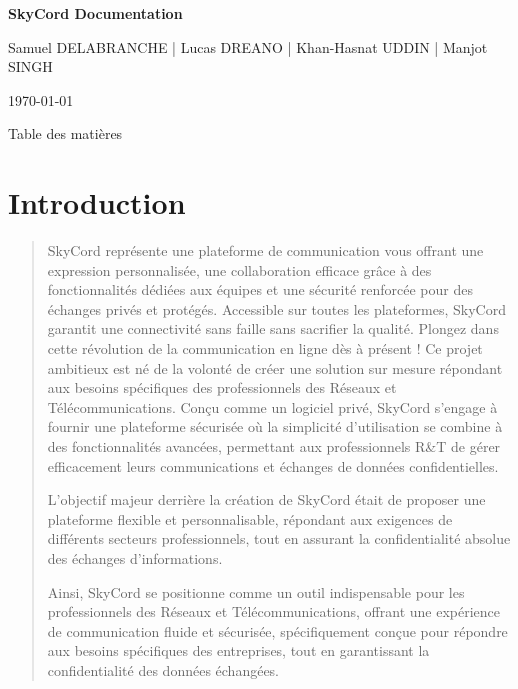 \documentclass{article}
\begin{document}
\noindent\hrulefill
\begin{flushright}
    \textbf{\Large SkyCord Documentation}
    
    Samuel DELABRANCHE | Lucas DREANO | Khan-Hasnat UDDIN | Manjot SINGH

    \vspace*{\fill}
    
    \today
\end{flushright}

\newpage
\vspace*{\fill}

\newpage
\noindent\hrulefill
\begin{flushright}
    \large Table des matières 
\end{flushright}
\noindent\hrulefill

\renewcommand{\contentsname}{}
\tableofcontents
{}

\newpage
{}
\section*{Introduction}

\begin{quote}    
SkyCord représente une plateforme de communication vous offrant une expression personnalisée, une collaboration efficace grâce à des fonctionnalités dédiées aux équipes et une sécurité renforcée pour des échanges privés et protégés. Accessible sur toutes les plateformes, SkyCord garantit une connectivité sans faille sans sacrifier la qualité. Plongez dans cette révolution de la communication en ligne dès à présent !
\vspace*{1\baselineskip}
Ce projet ambitieux est né de la volonté de créer une solution sur mesure répondant aux besoins spécifiques des professionnels des Réseaux et Télécommunications. Conçu comme un logiciel privé, SkyCord s'engage à fournir une plateforme sécurisée où la simplicité d'utilisation se combine à des fonctionnalités avancées, permettant aux professionnels R\&T de gérer efficacement leurs communications et échanges de données confidentielles.

\vspace*{1\baselineskip}
L'objectif majeur derrière la création de SkyCord était de proposer une plateforme flexible et personnalisable, répondant aux exigences de différents secteurs professionnels, tout en assurant la confidentialité absolue des échanges d'informations.

\vspace*{1\baselineskip}
Ainsi, SkyCord se positionne comme un outil indispensable pour les professionnels des Réseaux et Télécommunications, offrant une expérience de communication fluide et sécurisée, spécifiquement conçue pour répondre aux besoins spécifiques des entreprises, tout en garantissant la confidentialité des données échangées.
\end{quote}
\end{document}
